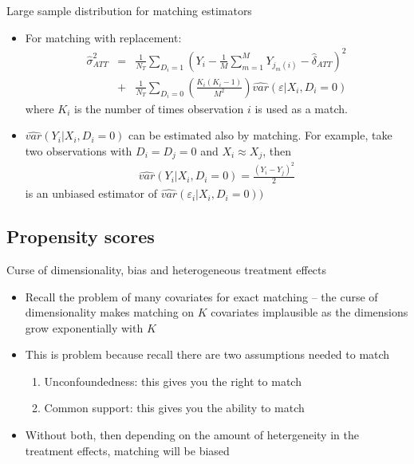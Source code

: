\documentclass{beamer}
\begin{document}
\begin{frame}{Large sample distribution for matching estimators}
	
	\begin{itemize}
	\item For matching with replacement:
		\begin{eqnarray*}
		\widehat{\sigma}^2_{ATT} &=& \frac{1}{N_T} \sum_{D_i=1} \left( Y_i - \frac{1}{M} \sum_{m=1}^M Y_{j_m(i)} - \widehat{\delta}_{ATT} \right)^2 \\
		&+& \frac{1}{N_T} \sum_{D_i=0} \left( \frac{K_i(K_i-1)}{M^2} \right) \widehat{var}(\varepsilon | X_i,D_i=0)
		\end{eqnarray*}where $K_i$ is the number of times observation $i$ is used as a match.
	\item $\widehat{var}(Y_i | X_i,D_i=0)$ can be estimated also by matching.  For example, take two observations with $D_i=D_j=0$ and $X_i \approx X_j$, then
		\begin{eqnarray*}
		\widehat{var}(Y_i | X_i,D_i=0) = \frac{(Y_i-Y_j)^2}{2}
		\end{eqnarray*}is an unbiased estimator of $\widehat{var}(\varepsilon_i | X_i,D_i=0))$
	\end{itemize}
\end{frame}


\subsection{Propensity scores}


\begin{frame}{Curse of dimensionality, bias and heterogeneous treatment effects}
	
	\begin{itemize}
	\item Recall the problem of many covariates for exact matching -- the curse of dimensionality makes matching on $K$ covariates implausible as the dimensions grow exponentially with $K$ 
	\item This is problem because recall there are two assumptions needed to match
		\begin{enumerate}
		\item Unconfoundedness: this gives you the right to match
		\item Common support: this gives you the ability to match
		\end{enumerate}
	\item Without both, then depending on the amount of hetergeneity in the treatment effects, matching will be biased
	\end{itemize}

\end{frame}
\end{document}
